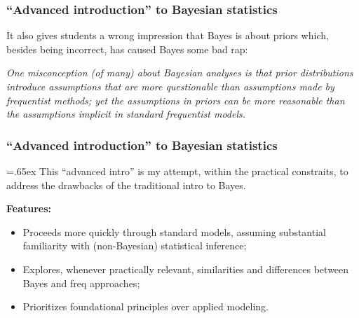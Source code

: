 \documentclass[18pt]{beamer}
\newenvironment{tightItemize}[1][]{%
  \vspace{-.3\baselineskip}%
  \begin{itemize}[#1]
  \addtolength\itemsep{-.1\baselineskip}
}{
  \end{itemize}
}
\begin{document}
\begin{frame}
\frametitle{``Advanced introduction'' to Bayesian statistics}

It also gives students a wrong impression that Bayes is about priors which, besides being incorrect, has caused Bayes some bad rap:

\begin{center}
\begin{minipage}{.89\linewidth}
{\slshape
One misconception (of many) about Bayesian analyses is that prior distributions introduce assumptions that are more questionable than assumptions made by frequentist methods; yet the assumptions in priors can be more reasonable than the assumptions implicit in standard frequentist models.}

\vspace*{.3\baselineskip}
\hfill \citep{greenland2006bayes_for_epi}
\end{minipage}
\end{center}

\end{frame}


\begin{frame}
\frametitle{``Advanced introduction'' to Bayesian statistics}

{\font=.65ex 
This ``advanced intro'' is my attempt, within the practical constraits, 
}%
to address the drawbacks of the traditional intro to Bayes.

\pause
\textbf{Features:} 
\begin{tightItemize}[<+->]
\item Proceeds more quickly through standard models, assuming substantial familiarity with (non-Bayesian) statistical inference;
\item Explores, whenever practically relevant, similarities and differences between Bayes and freq approaches;
\item Prioritizes foundational principles over applied modeling.
\end{tightItemize}

\end{frame}
\end{document}
